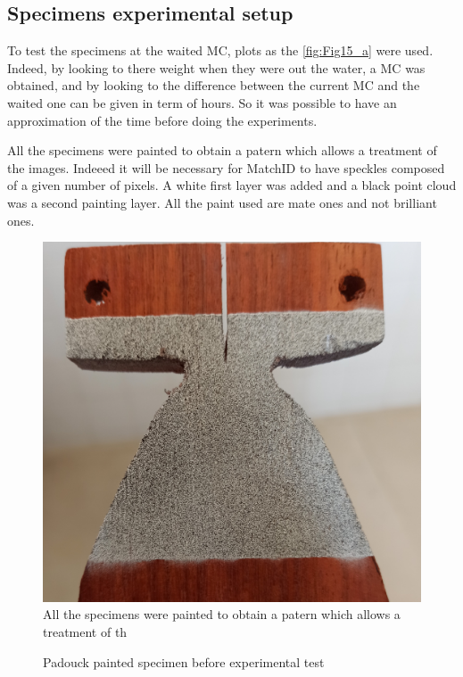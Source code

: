 \subsection{Specimens experimental setup}

To test the specimens at the waited MC, plots as the \ref{fig:Fig15_a} were used. Indeed, by looking to there weight when they were out the water, a MC was obtained, and by looking to the difference between the current MC and the waited one can be given in term of hours. So it was possible to have an approximation of the time before doing the experiments.

All the specimens were painted to obtain a patern which allows a treatment of the images. Indeeed it will be necessary for MatchID to have speckles composed of a given number of pixels. A white first layer was added and a black point cloud was a second painting layer. All the paint used are mate ones and not brilliant ones.
\begin{figure}[th]
	\centering
	\includegraphics[scale=0.08]{Figures/Painted_specimen}
	All the specimens were painted to obtain a patern which allows a treatment of th
	\caption[Padouck painted specimen]{Padouck painted specimen before experimental test}
	\label{fig:Fig17}
\end{figure}

